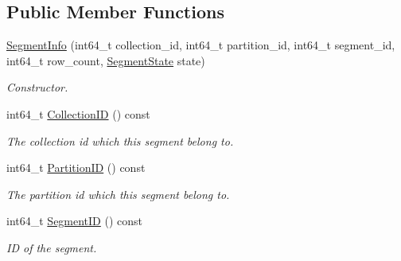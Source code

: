 \subsection*{Public Member Functions}
\begin{DoxyCompactItemize}
\item 
\mbox{\label{classmilvus_1_1_segment_info_abf2dd48b267d9604ec2691826256553a}} 
\hyperlink{classmilvus_1_1_segment_info_abf2dd48b267d9604ec2691826256553a}{Segment\+Info} (int64\+\_\+t collection\+\_\+id, int64\+\_\+t partition\+\_\+id, int64\+\_\+t segment\+\_\+id, int64\+\_\+t row\+\_\+count, \hyperlink{namespacemilvus_abe8ed76f6dc4b1b12a59f67fcef5afed}{Segment\+State} state)
\begin{DoxyCompactList}\small\item\em Constructor. \end{DoxyCompactList}\item 
\mbox{\label{classmilvus_1_1_segment_info_aeb5635df3b65361525a1fe30360b3700}} 
int64\+\_\+t \hyperlink{classmilvus_1_1_segment_info_aeb5635df3b65361525a1fe30360b3700}{Collection\+ID} () const
\begin{DoxyCompactList}\small\item\em The collection id which this segment belong to. \end{DoxyCompactList}\item 
\mbox{\label{classmilvus_1_1_segment_info_af90cf5f8a20981b416436abba4b312da}} 
int64\+\_\+t \hyperlink{classmilvus_1_1_segment_info_af90cf5f8a20981b416436abba4b312da}{Partition\+ID} () const
\begin{DoxyCompactList}\small\item\em The partition id which this segment belong to. \end{DoxyCompactList}\item 
\mbox{\label{classmilvus_1_1_segment_info_a599886968a2397433c87e5613481218c}} 
int64\+\_\+t \hyperlink{classmilvus_1_1_segment_info_a599886968a2397433c87e5613481218c}{Segment\+ID} () const
\begin{DoxyCompactList}\small\item\em ID of the segment. \end{DoxyCompactList}\item 
\mbox{\label{classmilvus_1_1_segment_info_adcf9ed245a2c6f52355e1c61b7d9cf9e}} 

\end{DoxyCompactItemize}
